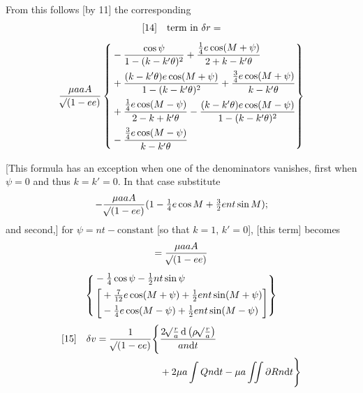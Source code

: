 From this follows [by 11] the corresponding
\[
\begin{gathered}
{}[14]\quad\text{term in }\delta r=\\[1ex]
\frac{\mu aaA}{\mathord{{}^{}\!\surd}(1-ee)}\left\{\begin{aligned}
&-\frac{\cos\psi}{1-(k-k'\theta)^2}+\frac{\tfrac14e\cos(M+\psi)}{2+k-k'\theta}\\
&+\frac{(k-k'\theta)e\cos(M+\psi)}{1-(k-k'\theta)^2}+\frac{\tfrac34e\cos(M+\psi)}{k-k'\theta}\\
&+\frac{\tfrac14e\cos(M-\psi)}{2-k+k'\theta}-\frac{(k-k'\theta)e\cos(M-\psi)}{1-(k-k'\theta)^2}\\
&-\frac{\tfrac34e\cos(M-\psi)}{k-k'\theta}
\end{aligned}\right\}
\end{gathered}
\]

[This formula has an exception when one of the denominators vanishes, first when \(\psi=0\) and thus \(k=k'=0\). In that case substitute
\[
-\frac{\mu aaA}{\mathord{{}^{}\!\surd}(1-ee)}(1-\tfrac14e\cos M+\tfrac32ent\sin M);
\]
\noindent and second,] for \(\psi=nt-\text{constant}\) [so that \(k=1\), \(k'=0\)], [this term] becomes
\[
\begin{gathered}
=\frac{\mu aaA}{\mathord{{}^{}\!\surd}(1-ee)}\\[1ex]
\left\{\begin{aligned}
&-\tfrac14\cos\psi-\tfrac12nt\sin\psi\\
&\left[\begin{aligned}
&+\tfrac7{12}e\cos(M+\psi)+\tfrac12ent\sin(M+\psi)\\
&-\tfrac14e\cos(M-\psi)+\tfrac12ent\sin(M-\psi)
\end{aligned}\right]
\end{aligned}\right\}
\end{gathered}
\]
\[
\begin{aligned}
{}[15]\quad\delta v=\frac1{\mathord{{}^{}\!\surd}(1-ee)}\Bigg\{&\frac{2\mathord{{}^{}\!\surd}\frac ra\,\mathrm{d}\left(\rho\mathord{{}^{}\!\surd}\frac ra\right)}{an\mathrm{d}t}\\
&+2\mu a\int Qn\mathrm{d}t-\mu a\iint\partial Rn\mathrm{d}t\Bigg\}
\end{aligned}
\]

